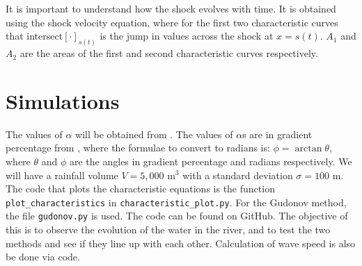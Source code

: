 \documentclass[12pt]{article}
\begin{document}
It is important to understand how the shock evolves with time. It is obtained using the shock velocity equation, where  for the first two characteristic curves that intersect$[\cdot]_{s(t)}$ is the jump in values across the shock at $x = s(t)$. $A_1$ and $A_2$ are the areas of the first and second characteristic curves respectively.

\section{Simulations}
\label{sec:results}
The values of $\alpha$ will be obtained from \cite{ROSGEN1994169}. The values of $\alpha$s are in gradient percentage from \cite{ROSGEN1994169}, where the formulae to convert to radians is: $\phi = \arctan{\theta}$, where $\theta$ and $\phi$ are the angles in gradient percentage and radians respectively. We will have a rainfall volume $V = 5,000\text{ m}^3$ \cite{} with a standard deviation $\sigma = 100\text{ m}$. The code that plots the characteristic equations is the function \verb|plot_characteristics| in \verb|characteristic_plot.py|. For the Gudonov method, the file \verb|gudonov.py| is used. The code can be found on GitHub\cite{linsuong_2023}. The objective of this is to observe the evolution of the water in the river, and to test the two methods and see if they line up with each other. Calculation of wave speed is also be done via code.
\end{document}
